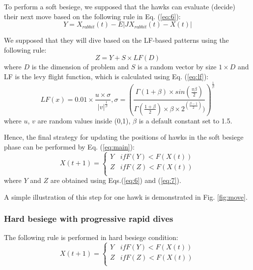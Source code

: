 \documentclass[preprint,12pt]{elsarticle}
\begin{document}
To perform a soft besiege, we supposed that the hawks can evaluate (decide) their next move based on the following rule in Eq. (\ref{eq:6}):
\begin{equation} \label{eq:6}
Y=X_{rabbit}(t)-E\left |JX_{rabbit}(t)-X(t)\right |
\end{equation}

We supposed that they will dive based on the LF-based patterns using the following rule:
\begin{equation} \label{eq:7}
Z=Y+S\times LF(D)
\end{equation}
where $D$ is the dimension of problem and $S$ is a random vector by size $1\times D$ and LF is the levy flight function, which is calculated using Eq. (\ref{eq:lf}):
\begin{equation} \label{eq:lf}
LF(x)=0.01\times \frac{u\times \sigma }{\left | v \right |^{\frac{1}{\beta }}}, \sigma =\left ( \frac{\Gamma (1+\beta )\times sin(\frac{\pi\beta}{2})}{\Gamma(\frac{1+\beta}{2})\times \beta\times2^{(\frac{\beta-1}{2})})}  \right )^{\frac{1}{\beta}}
\end{equation}
where $u$, $v$ are random values inside (0,1), $\beta$ is a default constant set to 1.5.


Hence, the final strategy for updating the positions of hawks in the soft besiege phase can be performed by Eq. (\ref{eq:main}):
\begin{equation} \label{eq:main}
X(t+1)=\left\{\begin{matrix}
Y & if F(Y)<F(X(t)) \\
Z  & if F(Z)<F(X(t)) \\
\end{matrix}\right.
\end{equation}
where $Y$ and $Z$ are obtained using Eqs.(\ref{eq:6}) and (\ref{eq:7}).

A simple illustration of this step for one hawk is demonstrated in Fig. \ref{fig:move}.


\subsubsection{Hard besiege with progressive rapid dives}

The following rule is performed in hard besiege condition:
\begin{equation} \label{eq:mainhard2}
X(t+1)=\left\{\begin{matrix}
Y & if F(Y)<F(X(t)) \\
Z  & if F(Z)<F(X(t)) \\
\end{matrix}\right.
\end{equation}
\end{document}

